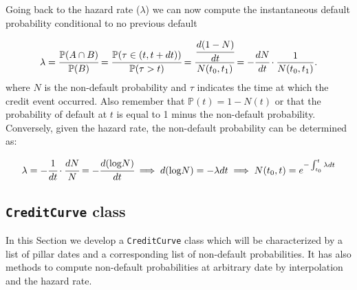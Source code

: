 Going back to the hazard rate ($\lambda$) we can now compute the instantaneous default probability conditional to no previous default 

\[\lambda = \cfrac{\mathbb{P}(A\cap B)}{\mathbb{P}(B)} = \cfrac{\mathbb{P}(\tau\in (t, t+dt))}{\mathbb{P}(\tau>t)} = \cfrac{\cfrac{d(1-N)}{dt}}{N(t_0, t_1)} = -\cfrac{dN}{dt}\cdot\frac{1}{N(t_0, t_1)}.\]
where $N$ is the non-default probability and $\tau$ indicates the time at which the credit event occurred. Also remember that $\mathbb{P}(t) = 1 - N(t)$ or that the probability of default at $t$ is equal to 1 minus the non-default probability.
Conversely, given the hazard rate, the non-default probability can be
determined as:

\[\lambda = -\cfrac{1}{dt}\cdot\cfrac{dN}{N} = -\cfrac{d(\textrm{log}N)}{dt} \implies d(\textrm{log}N) = -\lambda dt \implies N(t_0, t) = e^{-\int_{t_0}^{t}\lambda dt}\]

\subsection{\texttt{CreditCurve} class}

In this Section we develop a \texttt{CreditCurve} class which will be characterized by a list of pillar dates and a corresponding list of non-default probabilities. It has also methods to compute non-default probabilities at arbitrary date by interpolation and the hazard rate.
  
